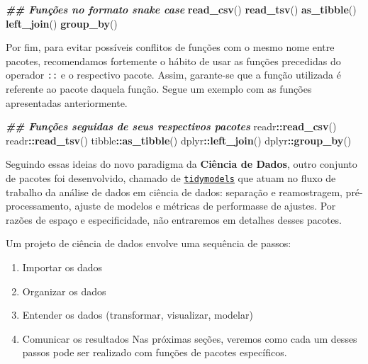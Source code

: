 \documentclass[
]{article}
\newenvironment{Shaded}{\begin{snugshade}}{\end{snugshade}}
\newcommand{\DocumentationTok}[1]{\textcolor[rgb]{0.56,0.35,0.01}{\textbf{\textit{#1}}}}
\newcommand{\FunctionTok}[1]{\textcolor[rgb]{0.13,0.29,0.53}{\textbf{#1}}}
\newcommand{\NormalTok}[1]{#1}
\newcommand{\SpecialCharTok}[1]{\textcolor[rgb]{0.81,0.36,0.00}{\textbf{#1}}}
\providecommand{\tightlist}{%
  \setlength{\itemsep}{0pt}\setlength{\parskip}{0pt}}
\begin{document}
\begin{Shaded}
\begin{Highlighting}[]
\DocumentationTok{\#\# Funções no formato snake case}
\FunctionTok{read\_csv}\NormalTok{()}
\FunctionTok{read\_tsv}\NormalTok{()}
\FunctionTok{as\_tibble}\NormalTok{()}
\FunctionTok{left\_join}\NormalTok{()}
\FunctionTok{group\_by}\NormalTok{()}
\end{Highlighting}
\end{Shaded}

Por fim, para evitar possíveis conflitos de funções com o mesmo nome entre pacotes, recomendamos fortemente o hábito de usar as funções precedidas do operador \texttt{::} e o respectivo pacote. Assim, garante-se que a função utilizada é referente ao pacote daquela função. Segue um exemplo com as funções apresentadas anteriormente.

\begin{Shaded}
\begin{Highlighting}[]
\DocumentationTok{\#\# Funções seguidas de seus respectivos pacotes}
\NormalTok{readr}\SpecialCharTok{::}\FunctionTok{read\_csv}\NormalTok{()}
\NormalTok{readr}\SpecialCharTok{::}\FunctionTok{read\_tsv}\NormalTok{()}
\NormalTok{tibble}\SpecialCharTok{::}\FunctionTok{as\_tibble}\NormalTok{()}
\NormalTok{dplyr}\SpecialCharTok{::}\FunctionTok{left\_join}\NormalTok{()}
\NormalTok{dplyr}\SpecialCharTok{::}\FunctionTok{group\_by}\NormalTok{()}
\end{Highlighting}
\end{Shaded}

Seguindo essas ideias do novo paradigma da \textbf{Ciência de Dados}, outro conjunto de pacotes foi desenvolvido, chamado de \href{https://www.tidymodels.org/}{\texttt{tidymodels}} que atuam no fluxo de trabalho da análise de dados em ciência de dados: separação e reamostragem, pré-processamento, ajuste de modelos e métricas de performasse de ajustes. Por razões de espaço e especificidade, não entraremos em detalhes desses pacotes.

Um projeto de ciência de dados envolve uma sequência de passos:

\begin{enumerate}
\def\labelenumi{\arabic{enumi}.}
\tightlist
\item
  Importar os dados
\item
  Organizar os dados
\item
  Entender os dados (transformar, visualizar, modelar)
\item
  Comunicar os resultados
  Nas próximas seções, veremos como cada um desses passos pode ser realizado com funções de pacotes específicos.
\end{enumerate}
\end{document}
